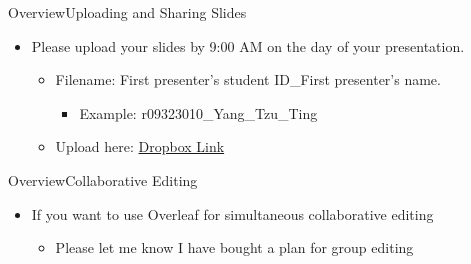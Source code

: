 \documentclass[hyperref={pdfpagelabels=false}]{beamer}
\begin{document}
\begin{frame}{Overview}{Uploading and Sharing Slides}
	\begin{itemize}
		\item Please upload your slides by 9:00 AM on the day of your presentation.
											\vspace{0.2cm}
		\begin{itemize}
			\item Filename: First presenter's student ID\_First presenter's name.
												\vspace{0.2cm}
			\begin{itemize}
				\item Example: r09323010\_Yang\_Tzu\_Ting
													\vspace{0.2cm}
			\end{itemize}
			\item Upload here: \href{https://www.dropbox.com/request/9M3SEqjgoLHWWRdmtOl7}{Dropbox Link}
		\end{itemize}
														\vspace{0.2cm}
	
	\end{itemize}
\end{frame}



\begin{frame}{Overview}{Collaborative Editing}
	\begin{itemize}
		
		\item If you want to use Overleaf for simultaneous collaborative editing
		
		\begin{itemize}
			\vspace{0.2cm}
			\item Please let me know I have bought a plan for group editing
		\end{itemize}
	\end{itemize}
\end{frame}
\end{document}
